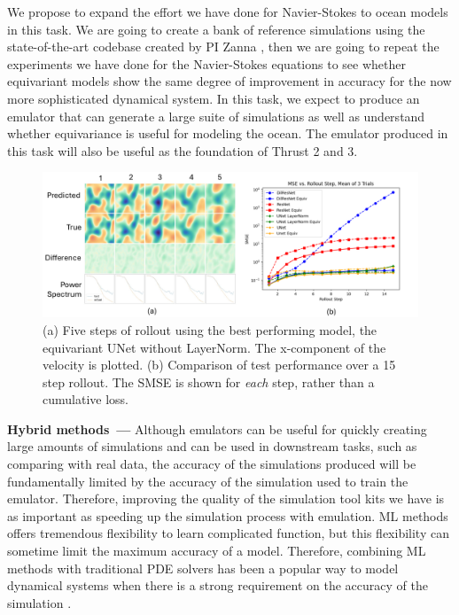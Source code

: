 \documentclass[11pt]{article}
\renewcommand{\paragraph}[1]{\medskip\par\noindent\textbf{#1~---}}
\begin{document}
We propose to expand the effort we have done for Navier-Stokes to ocean models in this task. We are going to create a bank of reference simulations using the state-of-the-art codebase created by PI Zanna \cite{pyqg}, then we are going to repeat the experiments we have done for the Navier-Stokes equations to see whether equivariant models show the same degree of improvement in accuracy for the now more sophisticated dynamical system. In this task, we expect to produce an emulator that can generate a large suite of simulations as well as understand whether equivariance is useful for modeling the ocean. The emulator produced in this task will also be useful as the foundation of Thrust 2 and 3.

\begin{figure}
    \includegraphics[width=\textwidth]{figures/cfd_results.pdf}
    \caption{(a) Five steps of rollout using the best performing model, the equivariant UNet without LayerNorm. 
    The x-component of the velocity is plotted.
    (b) Comparison of test performance over a 15 step rollout.
    The SMSE is shown for \textit{each} step, rather than a cumulative loss.}
    \label{fig:cfd_results}
\end{figure}

\paragraph{Hybrid methods}
Although emulators can be useful for quickly creating large amounts of simulations and can be used in downstream tasks, such as comparing with real data, the accuracy of the simulations produced will be fundamentally limited by the accuracy of the simulation used to train the emulator. Therefore, improving the quality of the simulation tool kits we have is as important as speeding up the simulation process with emulation. ML methods offers tremendous flexibility to learn complicated function, but this flexibility can sometime limit the maximum accuracy of a model. Therefore, combining ML methods with traditional PDE solvers has been a popular way to model dynamical systems when there is a strong requirement on the accuracy of the simulation \cite{Kidger2022OnND, Rackauckas2020UniversalDE}.
\end{document}
